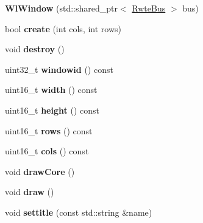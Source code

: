 \begin{DoxyCompactItemize}
\item 
\mbox{\label{classWlWindow_a19393a2e5f726bf7bf98cb18a37df6d3}} 
{\bfseries Wl\+Window} (std\+::shared\+\_\+ptr$<$ \mbox{\hyperlink{classBus}{Rwte\+Bus}} $>$ bus)
\item 
\mbox{\label{classWlWindow_a6ada67c1302407013da0d49562ad963e}} 
bool {\bfseries create} (int cols, int rows)
\item 
\mbox{\label{classWlWindow_a1ab85d6185be78f832a89f16990df637}} 
void {\bfseries destroy} ()
\item 
\mbox{\label{classWlWindow_a2b5611dff69f1e1be1d1dfdc2a415477}} 
uint32\+\_\+t {\bfseries windowid} () const
\item 
\mbox{\label{classWlWindow_a991c88b30986ea19cc3808a418708d0c}} 
uint16\+\_\+t {\bfseries width} () const
\item 
\mbox{\label{classWlWindow_a95a7ffbb6dd0b80ddbac8cb967caf401}} 
uint16\+\_\+t {\bfseries height} () const
\item 
\mbox{\label{classWlWindow_ad04ca5b8d5862b60ec763fb0f2e2de62}} 
uint16\+\_\+t {\bfseries rows} () const
\item 
\mbox{\label{classWlWindow_aa22bd5830814834ee1db246b906d32a9}} 
uint16\+\_\+t {\bfseries cols} () const
\item 
\mbox{\label{classWlWindow_a8adafaa210f8e2dc3a5038d358c03d9f}} 
void {\bfseries draw\+Core} ()
\item 
\mbox{\label{classWlWindow_a19eb05d0f188d06c26d589d758366825}} 
void {\bfseries draw} ()
\item 
\mbox{\label{classWlWindow_aa975f1f2b46218b8fa9425f333bc6f5a}} 
void {\bfseries settitle} (const std\+::string \&name)
\item 
\mbox{\label{classWlWindow_a148da84cfaf308369a7ebd37b221b97f}} 

\end{DoxyCompactItemize}
